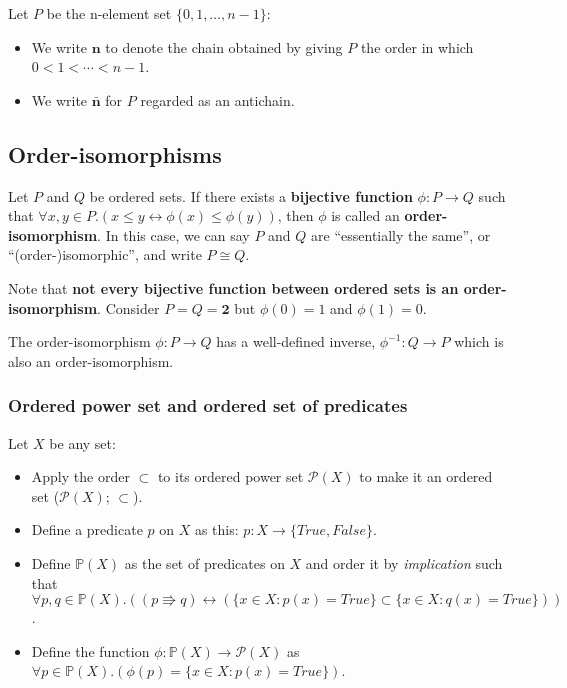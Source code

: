 \documentclass[12pt, letterpaper, oneside]{book}
\begin{document}
Let $P$ be the n-element set $\{0, 1, \ldots, n-1\}$:
\begin{itemize}
  \item We write $\mathbf{n}$ to denote the chain obtained by giving $P$ the order in which $0 < 1 < \cdots < n - 1$.
  \item We write $\mathbf{\bar{n}}$ for $P$ regarded as an antichain.
\end{itemize}

\subsection{Order-isomorphisms}

Let $P$ and $Q$ be ordered sets. If there exists a \textbf{bijective function} $\phi: P \rightarrow Q$ such that
$\forall x, y \in P. (x \leqslant y \leftrightarrow \phi(x) \leqslant \phi(y))$, then $\phi$ is called an \textbf{order-
  isomorphism}. In this case, we can say $P$ and $Q$ are ``essentially the same'', or ``(order-)isomorphic'', and write
$P \cong Q$.

Note that \textbf{not every bijective function between ordered sets is an order-isomorphism}. Consider $P = Q = \mathbf{2}$
but $\phi(0) = 1$ and $\phi(1) = 0$.

The order-isomorphism $\phi: P \rightarrow Q$ has a well-defined inverse, $\phi^{-1}: Q \rightarrow P$ which is also an
order-isomorphism.

\subsubsection{Ordered power set and ordered set of predicates}

Let $X$ be any set:
\begin{itemize}
  \item Apply the order $\subset$ to its ordered power set $\mathcal{P}(X)$ to make it an ordered set ($\mathcal{P}(X)$;
        $\subset$).
  \item Define a predicate $p$ on $X$ as this: $p: X \rightarrow \{True, False\}$.
  \item Define $\mathbb{P}(X)$ as the set of predicates on $X$ and order it by \textit{implication} such that
        $\forall p, q \in \mathbb{P}(X). ((p \Rrightarrow q) \leftrightarrow (\{x \in X: p(x) = True\} \subset
          \{x \in X: q(x) = True\}))$.
  \item Define the function $\phi: \mathbb{P}(X) \rightarrow \mathcal{P}(X)$ as $\forall p \in \mathbb{P}(X). (\phi(p)
          = \{x \in X: p(x) = True\})$.
\end{itemize}
\end{document}
